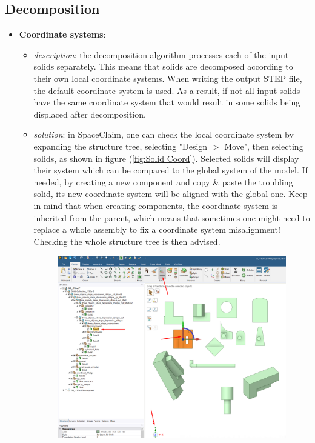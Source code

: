 \documentclass[12pt, a4paper, titlepage]{article}
\begin{document}
\subsection{Decomposition}
\begin{itemize}
	\item \textbf{Coordinate systems}: 
	\begin{itemize}
		\item \emph{description}: the decomposition algorithm processes each of the input solids separately. This means that solids are decomposed according to their own local coordinate systems. When writing the output STEP file, the default coordinate system is used. As a result, if not all input solids have the same coordinate system that would result in some solids being displaced after decomposition.
		\item \emph{solution}: in SpaceClaim, one can check the local coordinate system by expanding the structure tree, selecting "Design $>$ Move", then selecting solids, as shown in figure (\ref{fig:Solid Coord}). Selected solids will display their system which can be compared to the global system of the model. If needed, by creating a new component and copy \& paste the troubling solid, its new coordinate system will be aligned with the global one. Keep in mind that when creating components, the coordinate system is inherited from the parent, which means that sometimes one might need to replace a whole assembly to fix a coordinate system misalignment! Checking the whole structure tree is then advised. 
		\begin{figure}[h!]
			\centering
			\includegraphics[scale=0.38]{figures/issues_Coordinates.png}

\end{figure}
\end{itemize}
\end{itemize}
\end{document}
